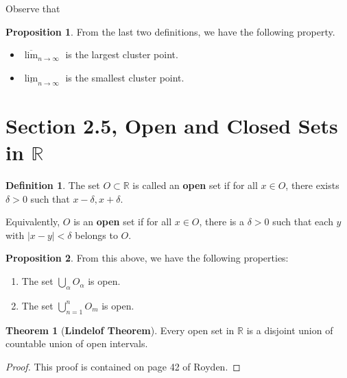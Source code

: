 \documentclass[12pt]{article}
\newcommand{\R}{\mathbb{R}}
\theoremstyle{definition}
\newtheorem*{thm}{Theorem}
\newtheorem*{definition}{Definition}
\newtheorem{prop}{Proposition}
\begin{document}
Observe that 

\begin{prop}
    From the last two definitions, we have the following property.
    \begin{itemize}

        \item \( \overline{\lim}_{n \to \infty} \) is the largest cluster point.
        \item \( \underline{\lim}_{n \to \infty} \) is the smallest cluster point.
    \end{itemize}
    
\end{prop}

\section*{Section 2.5, Open and Closed Sets in \( \R \)}

\begin{definition}
    The set \( O \subset \R \) is called an \textbf{open} set if for all \( x \in O \), there exists \( \delta > 0 \) such that \( x - \delta, x + \delta \).

    Equivalently, \( O \) is an \textbf{open} set if for all \( x \in O \), there is a \( \delta > 0 \) such that each \( y \) with \( |x - y| < \delta \) belongs to \( O \).
\end{definition}

\begin{prop}
    From this above, we have the following properties:

    \begin{enumerate}
        \item The set \( \displaystyle \bigcup_{\alpha} O_{\alpha} \) is open. 
        \item The set \( \displaystyle \bigcup_{n=1}^{n} O_m \) is open.
    \end{enumerate}
\end{prop}

\begin{thm}[\textbf{Lindelof Theorem}]

    Every open set in \( \R \) is a disjoint union of countable union of open intervals.

        \begin{proof}
            This proof is contained on page 42 of Royden.
        \end{proof}
    
\end{thm}
\end{document}
